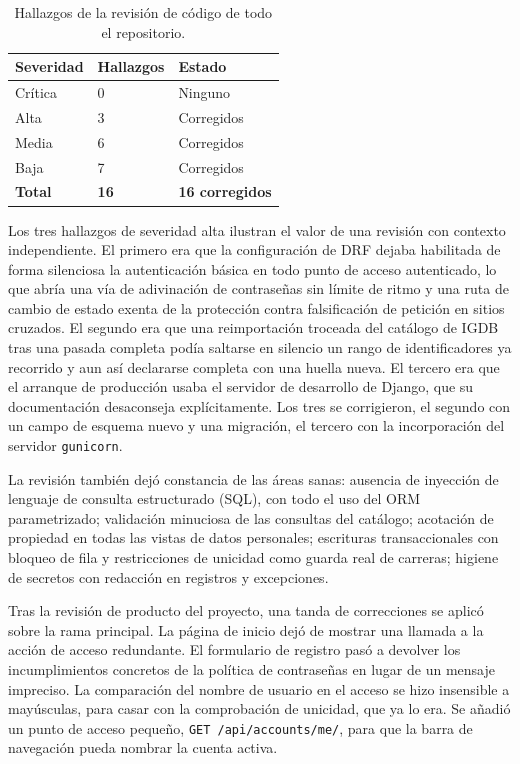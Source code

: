 \begin{table}[htp]
\centering
\begin{tabularx}{\textwidth}{ | L{0.25\textwidth} | C{0.18\textwidth} | Y | }
    \hline
    \textbf{Severidad} & \textbf{Hallazgos} & \textbf{Estado} \\
    \hline
    Crítica & 0 & Ninguno \\
    \hline
    Alta & 3 & Corregidos \\
    \hline
    Media & 6 & Corregidos \\
    \hline
    Baja & 7 & Corregidos \\
    \hline
    \textbf{Total} & \textbf{16} & \textbf{16 corregidos} \\
    \hline
\end{tabularx}
\caption{Hallazgos de la revisión de código de todo el repositorio.}
\label{tab:hallazgos}
\end{table}

Los tres hallazgos de severidad alta ilustran el valor de una revisión con contexto
independiente. El primero era que la configuración de DRF dejaba habilitada de forma
silenciosa la autenticación básica en todo punto de acceso autenticado, lo que abría una vía
de adivinación de contraseñas sin límite de ritmo y una ruta de cambio de estado exenta de la
protección contra falsificación de petición en sitios cruzados. El segundo era que una
reimportación troceada del catálogo de IGDB tras una pasada completa podía saltarse en
silencio un rango de identificadores ya recorrido y aun así declararse completa con una huella
nueva. El tercero era que el arranque de producción usaba el servidor de desarrollo de
Django, que su documentación desaconseja explícitamente. Los tres se corrigieron, el segundo
con un campo de esquema nuevo y una migración, el tercero con la incorporación del servidor
\texttt{gunicorn}.

La revisión también dejó constancia de las áreas sanas: ausencia de inyección de lenguaje de consulta estructurado (SQL), con
todo el uso del ORM parametrizado; validación minuciosa de las consultas del catálogo;
acotación de propiedad en todas las vistas de datos personales; escrituras transaccionales
con bloqueo de fila y restricciones de unicidad como guarda real de carreras; higiene de
secretos con redacción en registros y excepciones.

Tras la revisión de producto del proyecto, una tanda de correcciones se aplicó sobre la rama
principal. La página de inicio dejó de
mostrar una llamada a la acción de acceso redundante. El formulario de registro pasó a
devolver los incumplimientos concretos de la política de contraseñas en lugar de un mensaje
impreciso. La comparación del nombre de usuario en el acceso se hizo insensible a mayúsculas,
para casar con la comprobación de unicidad, que ya lo era. Se añadió un punto de acceso
pequeño, \texttt{GET /api/accounts/me/}, para que la barra de navegación pueda nombrar la
cuenta activa.

